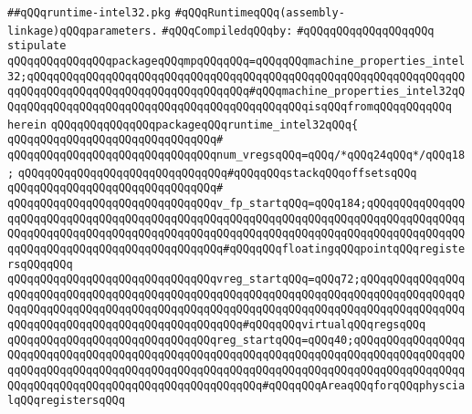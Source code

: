 \label{src/lib/compiler/back/low/main/intel32/runtime-intel32.pkg}
\verb|##qQQqruntime-intel32.pkg|\newline
\verb|#qQQqRuntimeqQQq(assembly-linkage)qQQqparameters.|\newline
\newline
\verb|#qQQqCompiledqQQqby:|\newline
\verb|#qQQqqQQqqQQqqQQqqQQq|\newline
\newline
\verb|stipulate|\newline
\verb|qQQqqQQqqQQqqQQqpackageqQQqmpqQQqqQQq=qQQqqQQqmachine_properties_intel32;qQQqqQQqqQQqqQQqqQQqqQQqqQQqqQQqqQQqqQQqqQQqqQQqqQQqqQQqqQQqqQQqqQQqqQQqqQQqqQQqqQQqqQQqqQQqqQQqqQQqqQQq#qQQqmachine_properties_intel32qQQqqQQqqQQqqQQqqQQqqQQqqQQqqQQqqQQqqQQqqQQqqQQqisqQQqfromqQQqqQQqqQQq|\newline
\verb|herein|\newline
\newline
\verb|qQQqqQQqqQQqqQQqpackageqQQqruntime_intel32qQQq{|\newline
\verb|qQQqqQQqqQQqqQQqqQQqqQQqqQQqqQQq#|\newline
\verb|qQQqqQQqqQQqqQQqqQQqqQQqqQQqqQQqnum_vregsqQQq=qQQq/*qQQq24qQQq*/qQQq18;|\newline
\newline
\verb|qQQqqQQqqQQqqQQqqQQqqQQqqQQqqQQq#qQQqqQQqstackqQQqoffsetsqQQq|\newline
\verb|qQQqqQQqqQQqqQQqqQQqqQQqqQQqqQQq#|\newline
\verb|qQQqqQQqqQQqqQQqqQQqqQQqqQQqqQQqv_fp_startqQQq=qQQq184;qQQqqQQqqQQqqQQqqQQqqQQqqQQqqQQqqQQqqQQqqQQqqQQqqQQqqQQqqQQqqQQqqQQqqQQqqQQqqQQqqQQqqQQqqQQqqQQqqQQqqQQqqQQqqQQqqQQqqQQqqQQqqQQqqQQqqQQqqQQqqQQqqQQqqQQqqQQqqQQqqQQqqQQqqQQqqQQqqQQqqQQqqQQq#qQQqqQQqfloatingqQQqpointqQQqregistersqQQqqQQq|\newline
\verb|qQQqqQQqqQQqqQQqqQQqqQQqqQQqqQQqvreg_startqQQq=qQQq72;qQQqqQQqqQQqqQQqqQQqqQQqqQQqqQQqqQQqqQQqqQQqqQQqqQQqqQQqqQQqqQQqqQQqqQQqqQQqqQQqqQQqqQQqqQQqqQQqqQQqqQQqqQQqqQQqqQQqqQQqqQQqqQQqqQQqqQQqqQQqqQQqqQQqqQQqqQQqqQQqqQQqqQQqqQQqqQQqqQQqqQQqqQQqqQQq#qQQqqQQqvirtualqQQqregsqQQq|\newline
\verb|qQQqqQQqqQQqqQQqqQQqqQQqqQQqqQQqreg_startqQQq=qQQq40;qQQqqQQqqQQqqQQqqQQqqQQqqQQqqQQqqQQqqQQqqQQqqQQqqQQqqQQqqQQqqQQqqQQqqQQqqQQqqQQqqQQqqQQqqQQqqQQqqQQqqQQqqQQqqQQqqQQqqQQqqQQqqQQqqQQqqQQqqQQqqQQqqQQqqQQqqQQqqQQqqQQqqQQqqQQqqQQqqQQqqQQqqQQqqQQqqQQq#qQQqqQQqAreaqQQqforqQQqphyscialqQQqregistersqQQq|\newline
